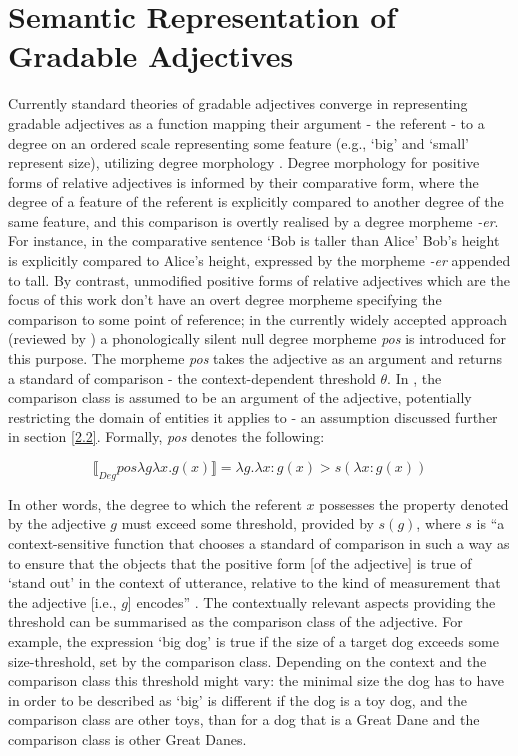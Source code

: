 \section{Semantic Representation of Gradable Adjectives}
\label{2.1.}
Currently standard theories of gradable adjectives converge in representing gradable adjectives as a function mapping their argument - the referent - to a degree on an ordered scale representing some feature (e.g., ‘big’ and ‘small’ represent size),  utilizing degree morphology \parencite{Kennedy2007}. Degree morphology for positive forms of relative adjectives is informed by their comparative form, where the degree of a feature of the referent is explicitly compared to another degree of the same feature, and this comparison is overtly realised by a degree morpheme \textit{-er}. For instance, in the comparative sentence ‘Bob is taller than Alice’ Bob’s height is explicitly compared to Alice’s height, expressed by the morpheme \textit{-er} appended to tall. 
By contrast, unmodified positive forms of relative adjectives which are the focus of this work don’t have an overt degree morpheme specifying the comparison to some point of reference; in the currently widely accepted approach (reviewed by \cite{Kennedy2007}) a phonologically silent null degree morpheme \textit{pos} is introduced for this purpose. 
The morpheme \textit{pos} takes the adjective as an argument and returns a standard of comparison - the context-dependent threshold $\theta$. In \textcite{Kennedy2007}, the comparison class is assumed to be an argument of the adjective, potentially restricting the domain of entities it applies to - an assumption discussed further in section \ref{2.2}. Formally, \textit{pos} denotes the following:

$$\llbracket_{Deg} pos \lambda g \lambda x. g(x)  \rrbracket = \lambda g. \lambda x: g(x) > s(\lambda x: g(x))$$

In other words, the degree to which the referent $x$ possesses the property denoted by the adjective $g$ must exceed some threshold, provided by $s(g)$, where $s$ is “a context-sensitive function that chooses a standard of comparison in such a way as to ensure that the objects that the positive form [of the adjective] is true of ‘stand out’ in the context of utterance, relative to the kind of measurement that the adjective [i.e., $g$] encodes” \parencite[p. 17]{Kennedy2007}. The contextually relevant aspects providing the threshold can be summarised as the comparison class of the adjective. 
For example, the expression ‘big dog’ is true if the size of a target dog exceeds some size-threshold, set by the comparison class. Depending on the context and the comparison class this threshold might vary: the minimal size the dog has to have in order to be described as ‘big’ is different if the dog is a toy dog, and the comparison class are other toys, than for a dog that is a Great Dane and the comparison class is other Great Danes.

